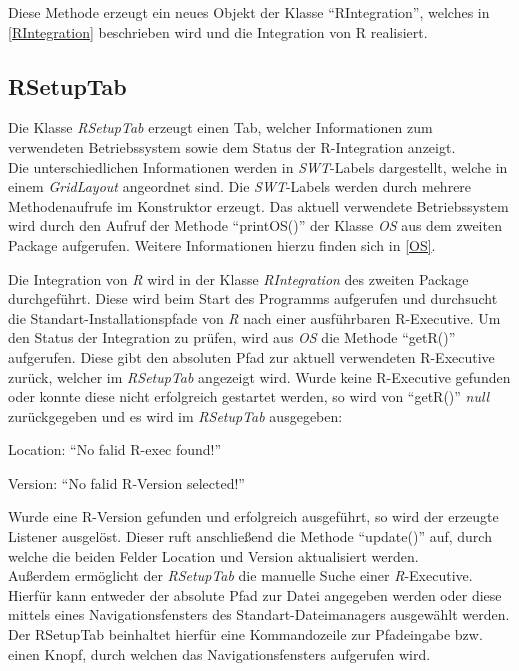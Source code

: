 \documentclass[a4paper, 12pt]{report} %
\begin{document}
Diese Methode erzeugt ein neues Objekt der Klasse "`RIntegration"', welches in \ref{RIntegration} beschrieben wird und die Integration von R realisiert.

\subsection{RSetupTab}

Die Klasse \textit{RSetupTab} erzeugt einen Tab, welcher Informationen zum verwendeten Betriebssystem sowie dem Status der R-Integration anzeigt.\\

Die unterschiedlichen Informationen werden in \textit{SWT}-Labels dargestellt, welche in einem \textit{GridLayout} angeordnet sind.
Die \textit{SWT}-Labels werden durch mehrere Methodenaufrufe im Konstruktor erzeugt.
Das aktuell verwendete Betriebssystem wird durch den Aufruf der Methode "`printOS()"' der Klasse \textit{OS} aus dem zweiten Package aufgerufen. Weitere Informationen hierzu finden sich in \ref{OS}.

Die Integration von \textit{R} wird in der Klasse \textit{RIntegration} des zweiten Package durchgeführt. Diese wird beim Start des Programms aufgerufen und durchsucht die Standart-Installationspfade von \textit{R} nach einer ausführbaren R-Executive.
 Um den Status der Integration zu prüfen, wird aus \textit{OS} die Methode "`getR()"' aufgerufen. Diese gibt den absoluten Pfad zur aktuell verwendeten R-Executive zurück, welcher im \textit{RSetupTab} angezeigt wird.
Wurde keine R-Executive gefunden oder konnte diese nicht erfolgreich gestartet werden, so wird von "`getR()"' \textit{null} zurückgegeben und es wird im \textit{RSetupTab} ausgegeben:  
\begin{center}
Location: "`No falid R-exec found!"'

Version: "`No falid R-Version selected!"'
\end{center}

Wurde eine R-Version gefunden und erfolgreich ausgeführt, so wird der erzeugte Listener ausgelöst. Dieser ruft anschließend die Methode "`update()"' auf, durch welche die beiden Felder Location und Version aktualisiert werden.\\

Außerdem ermöglicht der \textit{RSetupTab} die manuelle Suche einer \textit{R}-Executive. Hierfür kann entweder der absolute Pfad zur Datei angegeben werden oder diese mittels eines Navigationsfensters des Standart-Dateimanagers ausgewählt werden.
Der RSetupTab beinhaltet hierfür eine Kommandozeile zur Pfadeingabe bzw. einen Knopf, durch welchen das Navigationsfensters aufgerufen wird.
\end{document}
